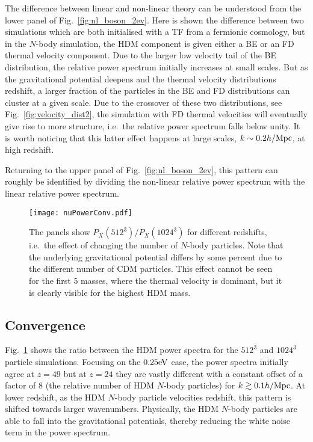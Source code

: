 \documentclass[11pt,a4paper]{article}
\renewcommand\({\left(}
\renewcommand\){\right)}
\renewcommand\[{\left[}
\renewcommand\]{\right]}
\begin{document}
The difference between linear and non-linear theory can be understood from the lower panel of Fig.~\ref{fig:nl_boson_2ev}. Here is shown the difference between two simulations which are both initialised with a TF from a fermionic cosmology, but in the $N$-body simulation, the HDM component is given either a BE or an FD thermal velocity component. Due to the larger low velocity tail of the BE distribution, the relative power spectrum initially increases at small scales. But as the gravitational potential deepens and the thermal velocity distributions redshift, a larger fraction of the particles in the BE and FD distributions can cluster at a given scale. Due to the crossover of these two distributions, see Fig.~\ref{fig:velocity_dist2}, the simulation with FD thermal velocities will eventually give rise to more structure, i.e.~the relative power spectrum falls below unity. It is worth noticing that this latter effect happens at large scales, $k\sim 0.2 h/{\rm Mpc}$, at high redshift.

Returning to the upper panel of Fig.~\ref{fig:nl_boson_2ev}, this pattern can roughly be identified by dividing the non-linear relative power spectrum with the linear relative power spectrum.

 \begin{figure}[t]
  \vspace*{-4.0cm}
\begin{center}
\hspace*{-1.0cm}
\texttt{[image: nuPowerConv.pdf]}
\end{center}
 \vspace*{-4cm}
\caption{The panels show $P_{X}(512^3) / P_{X}(1024^3)$ for different redshifts, i.e.~the effect of changing the number of $N$-body particles. Note that the underlying gravitational potential differs by some percent due to the different number of CDM particles. This effect cannot be seen for the first 5 masses, where the thermal velocity is dominant, but it is clearly visible for the highest HDM mass.}
   \label{fig:nu_power_conv}
\end{figure}
\subsection{Convergence}
Fig.~\ref{fig:nu_power_conv} shows the ratio between the HDM power spectra for the $512^3$ and $1024^3$ particle simulations. Focusing on the $0.25 {\rm eV}$ case, the power spectra initially agree at $z=49$ but at $z=24$ they are vastly different with a constant offset of a factor of 8 (the relative number of HDM $N$-body particles) for $k\gtrsim 0.1 h /{\rm Mpc}$. At lower redshift, as the HDM $N$-body particle velocities redshift, this pattern is shifted towards larger wavenumbers. Physically, the HDM $N$-body particles are able to fall into the gravitational potentials, thereby reducing the white noise term in the power spectrum.
\end{document}
